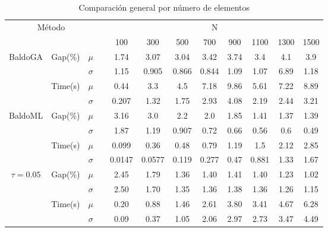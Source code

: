 \documentclass[spanish, a4paper, 12pt, openany,final]{book}
\begin{document}
\begin{table}[H]
	\begin{adjustbox}{width=\columnwidth,center}
		\begin{tabular}{cccccccccccc}
			
			\multicolumn{3}{c}{Método}&  &\multicolumn{8}{c}{N}\\
			\cline{1-3} \cline{5-12}
			\multicolumn{3}{c}{} &  & 100  & 300  & 500  & 700  & 900  & 1100 & 1300 & 1500\\
			\hline
			\multirow{4}{*}{BaldoGA} & \multirow{2}{*}{Gap(\%)} & $\mu$ && 1.74 & 3.07 & 3.04 & 3.42 & 3.74 & 3.4 & 4.1 & 3.9 \\
			&                          & $\sigma$ & & 1.15 & 0.905 & 0.866 & 0.844 & 1.09 & 1.07 & 6.89 & 1.18 \\
			\cline{2-3}
			& \multirow{2}{*}{Time(s)} & $\mu$ && 0.44 & 3.3 & 4.5 & 7.18 & 9.86 & 5.61 & 7.22 & 8.89 \\
			&                          & $\sigma$ & & 0.207 & 1.32 & 1.75 & 2.93 & 4.08 & 2.19 & 2.44 & 3.21 \\
			\hline		 	 
			\multirow{4}{*}{BaldoML} & \multirow{2}{*}{Gap(\%)} & $\mu$ && 3.16 & 3.0 & 2.2 & 2.0 & 1.85 & 1.41 & 1.37 & 1.39 \\
			&                          & $\sigma$ & & 1.87 & 1.19 & 0.907 & 0.72 & 0.66 & 0.56 & 0.6 & 0.49 \\
			\cline{2-3}
			& \multirow{2}{*}{Time(s)} & $\mu$    && 0.099 & 0.36 & 0.48 & 0.79 & 1.19 & 1.5 & 2.12 & 2.85 \\
			&                          & $\sigma$ && 0.0147 & 0.0577 & 0.119 & 0.277 & 0.47 & 0.881 & 1.33 & 1.67 \\
			\hline		 						 
			
			\multirow{4}{*}{$\tau=0.05$} & \multirow{2}{*}{Gap(\%)} & $\mu$ && 2.45 & 1.79 & 1.36 & 1.40 & 1.41 & 1.40 & 1.23 & 1.02 \\
			&                          & $\sigma$ & & 2.50 & 1.70 & 1.35 & 1.36 & 1.38 & 1.36 & 1.26 & 1.15 \\
			\cline{2-3}
			& \multirow{2}{*}{Time(s)} & $\mu$ && 0.20 & 0.88 & 1.46 & 2.61 & 3.80 & 3.41 & 4.67 & 6.28 \\
			&                          & $\sigma$ & & 0.09 & 0.37 & 1.05 & 2.06 & 2.97 & 2.73 & 3.47 & 4.49 \\
			\hline		 						        
			
		\end{tabular}
	\end{adjustbox}
	\caption{Comparación general por número de elementos}
	\label{tab:comparison_table}
\end{table}
\end{document}
